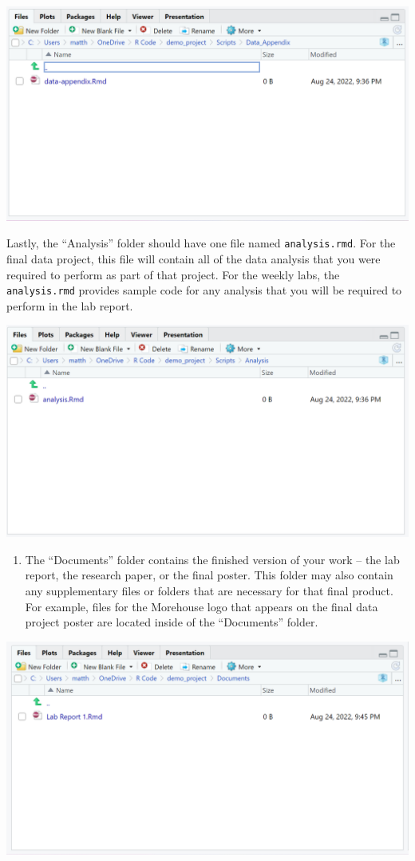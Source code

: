\documentclass[
]{book}
\providecommand{\tightlist}{%
  \setlength{\itemsep}{0pt}\setlength{\parskip}{0pt}}
\begin{document}
\includegraphics[width=18.69in]{images/data-appendix}

Lastly, the ``Analysis'' folder should have one file named \texttt{analysis.rmd}. For the final data project, this file will contain all of the data analysis that you were required to perform as part of that project. For the weekly labs, the \texttt{analysis.rmd} provides sample code for any analysis that you will be required to perform in the lab report.

\includegraphics[width=18.67in]{images/tieranalysis}

\begin{enumerate}
\def\labelenumi{\arabic{enumi}.}
\setcounter{enumi}{4}
\tightlist
\item
  The ``Documents'' folder contains the finished version of your work -- the lab report, the research paper, or the final poster. This folder may also contain any supplementary files or folders that are necessary for that final product. For example, files for the Morehouse logo that appears on the final data project poster are located inside of the ``Documents'' folder.
\end{enumerate}

\includegraphics[width=18.92in]{images/labreport}
\end{document}
